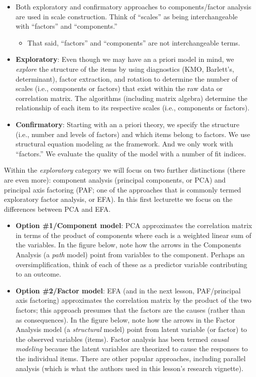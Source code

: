 \documentclass[
  english,
]{book}
\providecommand{\tightlist}{%
  \setlength{\itemsep}{0pt}\setlength{\parskip}{0pt}}
\begin{document}
\begin{itemize}
\item
  Both exploratory and confirmatory approaches to components/factor analysis are used in scale construction. Think of ``scales'' as being interchangeable with ``factors'' and ``components.''

  \begin{itemize}
  \tightlist
  \item
    That said, ``factors'' and ``components'' are not interchangeable terms.
  \end{itemize}
\item
  \textbf{Exploratory}: Even though we may have an a priori model in mind, we \emph{explore} the structure of the items by using diagnostics (KMO, Barlett's, determinant), factor extraction, and rotation to determine the number of scales (i.e., components or factors) that exist within the raw data or correlation matrix. The algorithms (including matrix algebra) determine the relationship of each item to its respective scales (i.e., components or factors).
\item
  \textbf{Confirmatory}: Starting with an a priori theory, we specify the structure (i.e., number and levels of factors) and which items belong to factors. We use structural equation modeling as the framework. And we only work with ``factors.'' We evaluate the quality of the model with a number of fit indices.
\end{itemize}

Within the \emph{exploratory} category we will focus on two further distinctions (there are even more): component analysis (principal components, or PCA) and principal axis factoring (PAF; one of the approaches that is commonly termed exploratory factor analysis, or EFA). In this first lecturette we focus on the differences between PCA and EFA.

\begin{itemize}
\item
  \textbf{Option \#1/Component model}: PCA approximates the correlation matrix in terms of the product of components where each is a weighted linear sum of the variables. In the figure below, note how the arrows in the Components Analysis (a \emph{path} model) point from variables to the component. Perhaps an oversimplification, think of each of these as a predictor variable contributing to an outcome.
\item
  \textbf{Option \#2/Factor model}: EFA (and in the next lesson, PAF/principal axis factoring) approximates the correlation matrix by the product of the two factors; this approach presumes that the factors are the causes (rather than as consequences). In the figure below, note how the arrows in the Factor Analysis model (a \emph{structural} model) point from latent variable (or factor) to the observed variables (items). Factor analysis has been termed \emph{causal modeling} because the latent variables are theorized to cause the responses to the individual items. There are other popular approaches, including parallel analysis (which is what the authors used in this lesson's research vignette).
\end{itemize}
\end{document}
